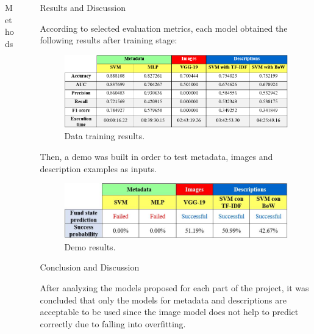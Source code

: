 \documentclass[final]{beamer}
\newlength{\sepwid}
\newlength{\onecolwid}
\begin{document}
\begin{frame}[t]
\begin{columns}[t]
\begin{column}{\onecolwid}
\begin{block}{Methods}
	\end{block}



\end{column} %






\begin{column}{\sepwid}\end{column} %

\begin{column}{\onecolwid} %
	\begin{block}{Results and Discussion}
		
		According to selected evaluation metrics, each model obtained the following results after training stage:
		
		\begin{figure}
			\includegraphics[width=0.8\linewidth]{resultados.png}
			\caption{Data training results.}
		\end{figure}
		
		Then, a demo was built in order to test metadata, images and description examples as inputs.
		
		\begin{figure}
			\includegraphics[width=0.8\linewidth]{demo.jpg}
			\caption{Demo results.}
		\end{figure}
		
	\end{block}
	\begin{block}{Conclusion and Discussion}
		
		After analyzing the models proposed for each part of the project, it was concluded that only the models for metadata and descriptions are acceptable to be used since the image model does not help to predict correctly due to falling into overfitting.
	\end{block}
	

\end{column}
\end{columns}
\end{frame}
\end{document}
